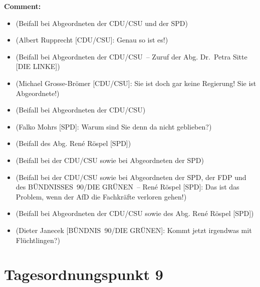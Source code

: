\documentclass{article}
\begin{document}
\noindent\textbf{Comment:}
\begin{itemize}
    \setlength\itemsep{-3pt}
    \item (Beifall bei Abgeordneten der CDU/CSU und der SPD)
    \setlength\itemsep{-3pt}
    \item (Albert Rupprecht [CDU/CSU]: Genau so ist es!)
    \setlength\itemsep{-3pt}
    \item (Beifall bei Abgeordneten der CDU/CSU – Zuruf der Abg. Dr. Petra Sitte [DIE LINKE])
    \setlength\itemsep{-3pt}
    \item (Michael Grosse-Brömer [CDU/CSU]: Sie ist doch gar keine Regierung! Sie ist Abgeordnete!)
    \setlength\itemsep{-3pt}
    \item (Beifall bei Abgeordneten der CDU/CSU)
    \setlength\itemsep{-3pt}
    \item (Falko Mohrs [SPD]: Warum sind Sie denn da nicht geblieben?)
    \setlength\itemsep{-3pt}
    \item (Beifall des Abg. René Röspel [SPD])
    \setlength\itemsep{-3pt}
    \item (Beifall bei der CDU/CSU sowie bei Abgeordneten der SPD)
    \setlength\itemsep{-3pt}
    \item (Beifall bei der CDU/CSU sowie bei Abgeordneten der SPD, der FDP und des BÜNDNISSES 90/DIE GRÜNEN – René Röspel [SPD]: Das ist das Problem, wenn der AfD die Fachkräfte verloren gehen!)
    \setlength\itemsep{-3pt}
    \item (Beifall bei Abgeordneten der CDU/CSU sowie des Abg. René Röspel [SPD])
    \setlength\itemsep{-3pt}
    \item (Dieter Janecek [BÜNDNIS 90/DIE GRÜNEN]: Kommt jetzt irgendwas mit Flüchtlingen?)
\end{itemize}
\section{Tagesordnungspunkt 9}
\end{document}
